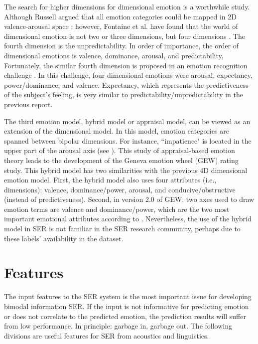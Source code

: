 The search for higher dimensions for dimensional emotion is a worthwhile study.
Although Russell argued that all emotion categories could be mapped in 2D
valence-arousal space \cite{Russell1980}; however, Fontaine et al. have found
that the world of dimensional emotion is not two or three dimensions, but four
dimensions \cite{Fontaine2017}. The fourth dimension is the unpredictability. In
order of importance, the order of dimensional emotions is valence, dominance,
arousal, and predictability. Fortunately, the similar fourth dimension is
proposed in an emotion recognition challenge \cite{Schuller2012}. In this
challenge, four-dimensional emotions were arousal, expectancy, power/dominance,
and valence. Expectancy, which represents the predictiveness of the subject's
feeling, is very similar to predictability/unpredictability in the previous
report.

The third emotion model, hybrid model or appraisal model, can be viewed as an
extension of the dimensional model. In this model, emotion categories are
spanned between bipolar dimensions. For instance, ``impatience" is located in
the upper part of the arousal axis (see \cite{Scherer2005}). This study of
appraisal-based emotion theory leads to the development of the Geneva emotion
wheel (GEW) rating study. This hybrid model has two similarities with the
previous 4D dimensional emotion model. First, the hybrid model also uses four
attributes (i.e., dimensions): valence, dominance/power, arousal, and
conducive/obstructive (instead of predictiveness). Second, in version 2.0 of
GEW, two axes used to draw emotion terms are valence and dominance/power, which
are the two most important emotional attributes according to
\cite{Fontaine2017}. Nevertheless, the use of the hybrid model in SER is not
familiar in the SER research community, perhaps due to these labels'
availability in the dataset.

\section{Features}
The input features to the SER system is the most important issue for developing
bimodal information SER. If the input is not informative for predicting emotion
or does not correlate to the predicted emotion, the prediction results will
suffer from low performance. In principle: garbage in, garbage out.  The
following divisions are useful features for SER from acoustics and linguistics.


